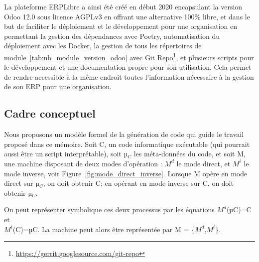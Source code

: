 La plateforme ERPLibre a ainsi été créé en début 2020 encapsulant la version Odoo 12.0 sous licence AGPLv3 en offrant une alternative 100\% libre, et dans le but de faciliter le déploiement et le développement pour une organisation en permettant la gestion des dépendances avec Poetry, automatisation du déploiement avec les Docker, la gestion de tous les répertoires de module~\ref{tab:nb_module_version_odoo} avec Git Repo\footnote{\url{https://gerrit.googlesource.com/git-repo}}, et plusieurs scripts pour le développement et une documentation propre pour son utilisation. Cela permet de rendre accessible à la même endroit toutes l'information nécessaire à la gestion de son ERP pour une organisation.





\subsection{Cadre conceptuel} \label{subsection_cadre_conceptuel}

Nous proposons un modèle formel de la génération de code qui guide le travail proposé dans ce mémoire. Soit C, un code informatique exécutable (qui pourrait aussi être un script interprétable), soit µ$_C$ les méta-données du code, et soit M, une machine disposant de deux modes d’opération : $M^d$ le mode direct, et $M^i$ le mode inverse, voir Figure~\ref{fig:mode_direct_inverse}. Lorsque M opère en mode direct sur µ$_C$, on doit obtenir C; en opérant en mode inverse sur C, on doit obtenir µ$_C$.

On peut représenter symbolique ces deux processus par les équations
$M^d$(µC)=C et \\ $M^i$(C)=µC. La machine peut alors être représentée par M = \{$M^d$,$M^i$\}.

